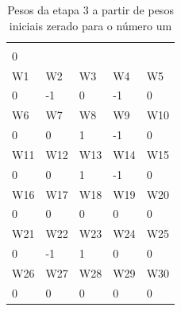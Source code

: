 \documentclass[11pt]{article}
\begin{document}
\begin{table}[h]
\centering
\caption{Pesos da etapa 3 a partir de pesos iniciais zerado para o número um}
\label{tab:wp1z_3}
\begin{tabular}{lllll}
\cellcolor[HTML]{000000}{\color[HTML]{FFFFFF} W0} &                            &                            &                            &                            \\
0                                                 &                            &                            &                            &                            \\
\rowcolor[HTML]{000000}
{\color[HTML]{FFFFFF} W1}                         & {\color[HTML]{FFFFFF} W2}  & {\color[HTML]{FFFFFF} W3}  & {\color[HTML]{FFFFFF} W4}  & {\color[HTML]{FFFFFF} W5}  \\
0                                                 & -1                         & 0                          & -1                         & 0                          \\
\rowcolor[HTML]{000000}
{\color[HTML]{FFFFFF} W6}                         & {\color[HTML]{FFFFFF} W7}  & {\color[HTML]{FFFFFF} W8}  & {\color[HTML]{FFFFFF} W9}  & {\color[HTML]{FFFFFF} W10} \\
0                                                 & 0                          & 1                          & -1                         & 0                          \\
\rowcolor[HTML]{000000}
{\color[HTML]{FFFFFF} W11}                        & {\color[HTML]{FFFFFF} W12} & {\color[HTML]{FFFFFF} W13} & {\color[HTML]{FFFFFF} W14} & {\color[HTML]{FFFFFF} W15} \\
0                                                 & 0                          & 1                          & -1                         & 0                          \\
\rowcolor[HTML]{000000}
{\color[HTML]{FFFFFF} W16}                        & {\color[HTML]{FFFFFF} W17} & {\color[HTML]{FFFFFF} W18} & {\color[HTML]{FFFFFF} W19} & {\color[HTML]{FFFFFF} W20} \\
0                                                 & 0                          & 0                          & 0                          & 0                          \\
\rowcolor[HTML]{000000}
{\color[HTML]{FFFFFF} W21}                        & {\color[HTML]{FFFFFF} W22} & {\color[HTML]{FFFFFF} W23} & {\color[HTML]{FFFFFF} W24} & {\color[HTML]{FFFFFF} W25} \\
0                                                 & -1                         & 1                          & 0                          & 0                          \\
\rowcolor[HTML]{000000}
{\color[HTML]{FFFFFF} W26}                        & {\color[HTML]{FFFFFF} W27} & {\color[HTML]{FFFFFF} W28} & {\color[HTML]{FFFFFF} W29} & {\color[HTML]{FFFFFF} W30} \\
0                                                 & 0                          & 0                          & 0                          & 0
\end{tabular}
\end{table}
\end{document}
